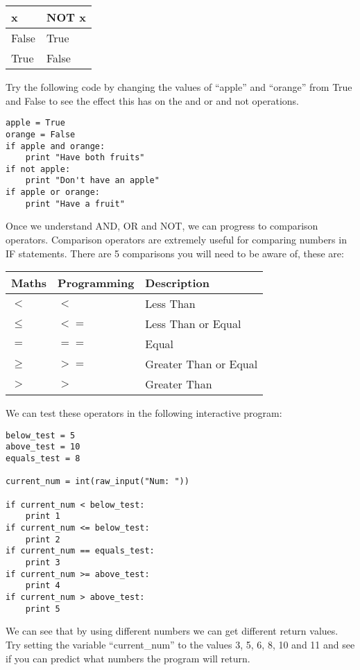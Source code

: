 \documentclass[twocolumn]{article}
\begin{document}
\begin{center}
\begin{tabular}{ll} 
		\toprule
		x & NOT x \\
		\midrule
		False & True \\
		True & False \\
		\bottomrule
	\end{tabular}
\end{center}
Try the following code by changing the values of ``apple'' and ``orange'' from True and False to see the effect this has on the and or and not operations.
\begin{lstlisting}
apple = True
orange = False
if apple and orange:
	print "Have both fruits"
if not apple:
	print "Don't have an apple"
if apple or orange:
	print "Have a fruit"
\end{lstlisting}
Once we understand AND, OR and NOT, we can progress to comparison operators. Comparison operators are extremely useful for comparing numbers in IF statements. There are 5 comparisons you will need to be aware of, these are:
\begin{center}
	\begin{tabular}{lll} 
		\toprule
		Maths & Programming & Description\\
		\midrule
		$<$ & $<$ & Less Than\\
		$\le$ & $<=$ & Less Than or Equal\\
		$=$ & $==$ & Equal\\
		$\ge$ & $>=$ & Greater Than or Equal\\
		$>$ & $>$ & Greater Than\\
		\bottomrule
	\end{tabular}
\end{center}
We can test these operators in the following interactive program:
\begin{lstlisting}
below_test = 5
above_test = 10
equals_test = 8

current_num = int(raw_input("Num: "))

if current_num < below_test:
	print 1
if current_num <= below_test:
	print 2
if current_num == equals_test:
	print 3
if current_num >= above_test:
	print 4
if current_num > above_test:
	print 5
\end{lstlisting}
We can see that by using different numbers we can get different return values. Try setting the variable ``current\_num'' to the values 3, 5, 6, 8, 10 and 11 and see if you can predict what numbers the program will return.
\end{document}
